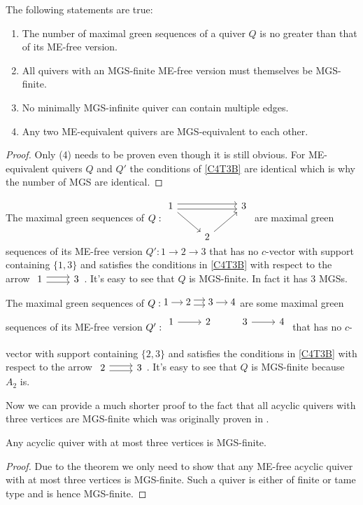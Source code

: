 \begin{corollary}\label{C4CB}
The following statements are true:
\begin{enumerate}
\item The number of maximal green sequences of a quiver $Q$ is no greater than that of its ME-free version.
\item All quivers with an MGS-finite ME-free version must themselves be MGS-finite.
\item No minimally MGS-infinite quiver can contain multiple edges.
\item Any two ME-equivalent quivers are MGS-equivalent to each other.
\end{enumerate}
\end{corollary}
\begin{proof}
\indent Only (4) needs to be proven even though it is still obvious. For ME-equivalent quivers $Q$ and $Q'$ the conditions of \ref{C4T3B} are identical which is why the number of MGS are identical.
\end{proof}
\begin{example}
The maximal green sequences of $Q: \begin{tikzcd}
1\righttwicedoublearrow\arrow[rd] &  & 3\\
 & 2\arrow[ur]
\end{tikzcd}$ are maximal green sequences of its ME-free version $Q': 1\to 2\to 3$ that has no $c$-vector with support containing $\{1,3\}$ and satisfies the conditions in \ref{C4T3B} with respect to the arrow $\begin{tikzcd} 1\rightdoublearrow & 3\end{tikzcd}$. It's easy to see that $Q$ is MGS-finite. In fact it has 3 MGSs.
\end{example}
\begin{example}
The maximal green sequences of $Q: \begin{tikzcd}[cramped, sep=small]
1\arrow[r] & 2 \rightdoublearrow&  3 \arrow[r] & 4\\
\end{tikzcd}$ are some maximal green sequences of its ME-free version $Q': \begin{tikzcd}
1\arrow[r] & 2&  3 \arrow[r] & 4\\
\end{tikzcd}$  that has no $c$-vector with support containing $\{2,3\}$ and satisfies the conditions in \ref{C4T3B} with respect to the arrow $\begin{tikzcd} 2\rightdoublearrow & 3\end{tikzcd}$. It's easy to see that $Q$ is MGS-finite because $A_2$ is.
\end{example}
\indent Now we can provide a much shorter proof to the fact that all acyclic quivers with three vertices are MGS-finite which was originally proven in \cite{BDP13}.
\begin{corollary}
Any acyclic quiver with at most three vertices is MGS-finite.
\end{corollary}
\begin{proof}
Due to the theorem we only need to show that any ME-free acyclic quiver with at most three vertices is MGS-finite. Such a quiver is either of finite or tame type and is hence MGS-finite.
\end{proof}
